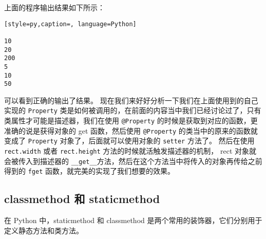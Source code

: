 上面的程序输出结果如下所示：
\begin{lstlisting}[style=py,caption=, language=Python]

10
20
200
5
10
50
\end{lstlisting}
可以看到正确的输出了结果。
现在我们来好好分析一下我们在上面使用到的自己实现的 \verb|Property| 类是如何被调用的，在前面的内容当中我们已经讨论过了，只有类属性才可能是描述器，我们在使用 \verb|@Property| 的时候是获取到对应的函数，更准确的说是获得对象的 get 函数，然后使用 \verb|@Property| 的类当中的原来的函数就变成了 \verb|Property| 对象了，后面就可以使用对象的 \verb|setter| 方法了。
然后在使用 \verb|rect.width| 或者 \verb|rect.height| 方法的时候就活触发描述器的机制， rect 对象就会被传入到描述器的 \verb|__get__|方法，然后在这个方法当中将传入的对象再传给之前得到的 \verb|fget| 函数，就完美的实现了我们想要的效果。
\subsection{classmethod 和 staticmethod}
在 Python 中，staticmethod 和 classmethod 是两个常用的装饰器，它们分别用于定义静态方法和类方法。
